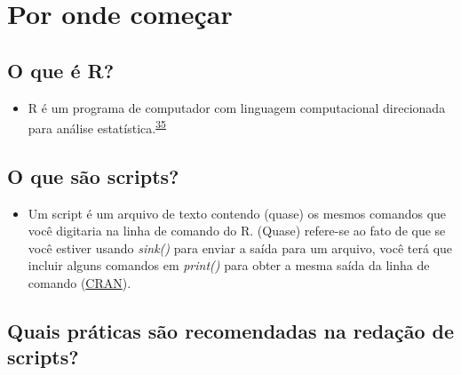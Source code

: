 \documentclass[
]{book}
\providecommand{\tightlist}{%
  \setlength{\itemsep}{0pt}\setlength{\parskip}{0pt}}
\begin{document}
\hypertarget{inicio}{%
\section{Por onde começar}\label{inicio}}

\hypertarget{o-que-uxe9-r}{%
\subsection{O que é R?}\label{o-que-uxe9-r}}

\begin{itemize}
\tightlist
\item
  R é um programa de computador com linguagem computacional direcionada para análise estatística.\textsuperscript{\protect\hyperlink{ref-ihaka1996}{35}}
\end{itemize}

\hypertarget{o-que-suxe3o-scripts}{%
\subsection{O que são scripts?}\label{o-que-suxe3o-scripts}}

\begin{itemize}
\tightlist
\item
  Um script é um arquivo de texto contendo (quase) os mesmos comandos que você digitaria na linha de comando do R. (Quase) refere-se ao fato de que se você estiver usando \emph{sink()} para enviar a saída para um arquivo, você terá que incluir alguns comandos em \emph{print()} para obter a mesma saída da linha de comando (\href{https://cran.r-project.org/doc/contrib/Lemon-kickstart/kr_scrpt.html}{CRAN}).
\end{itemize}

\hypertarget{quais-pruxe1ticas-suxe3o-recomendadas-na-redauxe7uxe3o-de-scripts}{%
\subsection{Quais práticas são recomendadas na redação de scripts?}\label{quais-pruxe1ticas-suxe3o-recomendadas-na-redauxe7uxe3o-de-scripts}}
\end{document}
